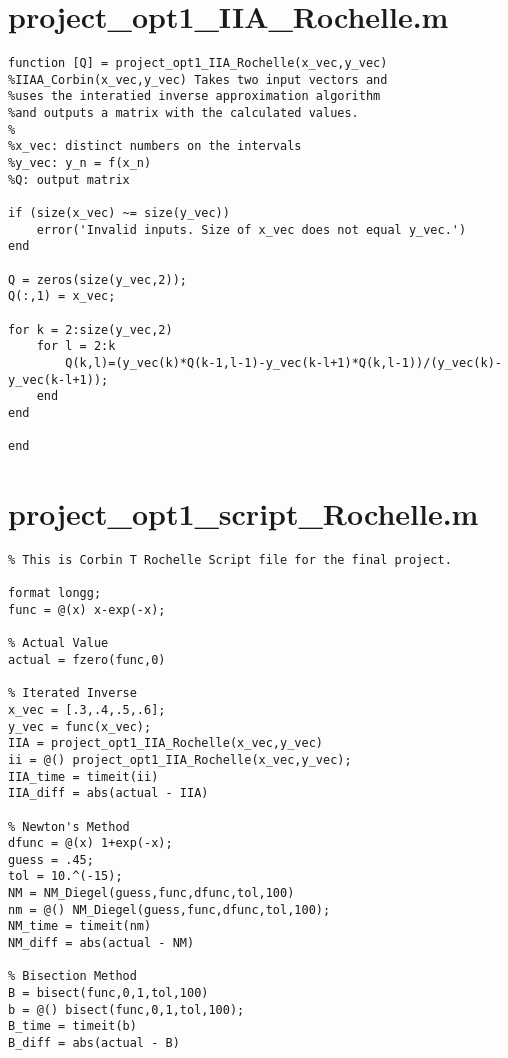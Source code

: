 \documentclass[12pt]{article}
\begin{document}
{\small
\section{project\_opt1\_IIA\_Rochelle.m}
\begin{verbatim}
function [Q] = project_opt1_IIA_Rochelle(x_vec,y_vec)
%IIAA_Corbin(x_vec,y_vec) Takes two input vectors and 
%uses the interatied inverse approximation algorithm
%and outputs a matrix with the calculated values.
%
%x_vec: distinct numbers on the intervals
%y_vec: y_n = f(x_n)
%Q: output matrix

if (size(x_vec) ~= size(y_vec))
	error('Invalid inputs. Size of x_vec does not equal y_vec.')
end

Q = zeros(size(y_vec,2));
Q(:,1) = x_vec;

for k = 2:size(y_vec,2)
	for l = 2:k
		Q(k,l)=(y_vec(k)*Q(k-1,l-1)-y_vec(k-l+1)*Q(k,l-1))/(y_vec(k)-y_vec(k-l+1));
	end
end

end
\end{verbatim}

\section{project\_opt1\_script\_Rochelle.m}
\begin{verbatim}
% This is Corbin T Rochelle Script file for the final project.

format longg;
func = @(x) x-exp(-x);

% Actual Value
actual = fzero(func,0)

% Iterated Inverse
x_vec = [.3,.4,.5,.6];
y_vec = func(x_vec);
IIA = project_opt1_IIA_Rochelle(x_vec,y_vec)
ii = @() project_opt1_IIA_Rochelle(x_vec,y_vec);
IIA_time = timeit(ii)
IIA_diff = abs(actual - IIA)

% Newton's Method
dfunc = @(x) 1+exp(-x);
guess = .45;
tol = 10.^(-15);
NM = NM_Diegel(guess,func,dfunc,tol,100)
nm = @() NM_Diegel(guess,func,dfunc,tol,100);
NM_time = timeit(nm)
NM_diff = abs(actual - NM)

% Bisection Method
B = bisect(func,0,1,tol,100)
b = @() bisect(func,0,1,tol,100);
B_time = timeit(b)
B_diff = abs(actual - B)
\end{verbatim}
}
\end{document}
